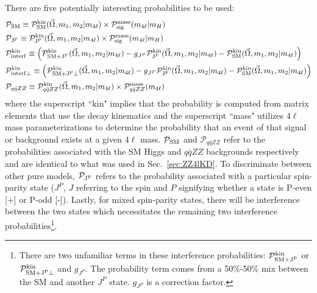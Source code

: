 There are five potentially interesting probabilities to be used:
\begin{align}
& {\mathcal{P}}_{\rm SM} \equiv {\mathcal{P}}^{\rm kin}_{\rm SM} (\vec\Omega, m_1, m_2|m_{4\ell}) \times {\mathcal{P}}^{\rm mass}_{\rm sig} (m_{4\ell}|m_H) \nonumber \\
& {\mathcal{P}}_{\rm J^P} \equiv {\mathcal{P}}^{\rm kin}_{\rm J^P} (\vec\Omega, m_1, m_2|m_{4\ell}) \times {\mathcal{P}}^{\rm mass}_{\rm sig} (m_{4\ell}|m_H) \nonumber \\
& {\mathcal{P}}^{\rm kin}_{\rm interf} \equiv \left({\mathcal{P}}^{\rm kin}_{\rm SM + J^P}(\vec\Omega, m_1, m_2|m_{4\ell}) - g_{J^P}{\mathcal{P}}^{\rm kin}_{\rm J^P}(\vec\Omega, m_1, m_2|m_{4\ell}) - {\mathcal{P}}^{\rm kin}_{\rm SM}(\vec\Omega, m_1, m_2|m_{4\ell}
) \right) \nonumber \\
& {\mathcal{P}}^{\rm kin}_{\rm interf \perp} \equiv \left({\mathcal{P}}^{\rm kin}_{\rm SM + J^P \perp}(\vec\Omega, m_1, m_2|m_{4\ell}) - g_{J^P}{\mathcal{P}}^{\rm kin}_{\rm J^P}(\vec\Omega, m_1, m_2|m_{4\ell}) - {\mathcal{P}}^{\rm kin}_{\rm SM}(\vec\Omega, m_1, m
_2|m_{4\ell}) \right) \nonumber \\
& {\mathcal{P}}_{q\bar{q}ZZ} \equiv {\mathcal{P}}^{\rm kin}_{q\bar{q}ZZ} (\vec\Omega, m_1, m_2|m_{4\ell}) \times {\mathcal{P}}^{\rm mass}_{q\bar{q}ZZ} (m_{4\ell}) \nonumber
\end{align}
where the superscript ``kin" implies that the probability is computed from matrix elements that use the decay kinematics and the superscript ``mass" utilizes $4\ell$ mass parameterizations to determine the probability that an event of that signal or background exists at a given $4\ell$ mass. ${\mathcal{P}}_{\rm SM}$ and ${\mathcal{P}}_{q\bar{q}ZZ}$ refer to the probabilities associated with the SM Higgs and $q\bar{q}ZZ$ backgrounds respectively and are identical to what was used in Sec.~\ref{sec:ZZ4lKD}. To discriminate between other pure models, ${\mathcal{P}}_{\rm J^P}$ refers to the probability associated with a particular spin-parity state ($J^P$, $J$ referring to the spin and $P$ signifying whether a state is P-even [+] or P-odd [-]). Lastly, for mixed spin-parity states, there will be interference between the two states which necessitates the remaining two interference probabilities\footnote{There are two unfamiliar terms in these interference probabilities: ${\mathcal{P}}^{\rm kin}_{\rm SM + J^P}$ or ${\mathcal{P}}^{\rm kin}_{\rm SM + J^P \perp}$ and $g_{J^P}$. The probability term comes from a 50\%-50\% mix between the SM and another $J^P$ state. $g_{J^P}$ is a correction factor.}.

